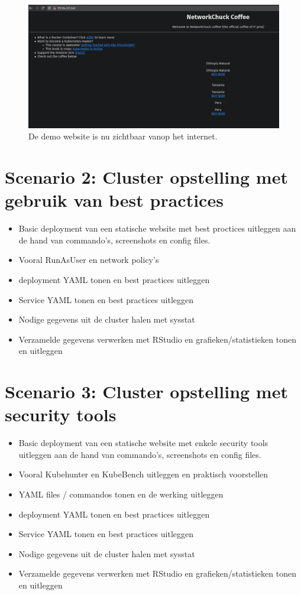 \begin{figure}[h]
	\centering
	\includegraphics[width=\linewidth]{img/demoSite1.png}
	\caption{De demo website is nu zichtbaar vanop het internet.}
	\label{fig:demoSite1}
\end{figure}


\clearpage
\section{Scenario 2: Cluster opstelling met gebruik van best practices}
\begin{itemize}
	\item Basic deployment van een statische website met best proctices uitleggen aan de hand van commando's, screenshots en config files. 
	\item Vooral RunAsUser en network policy's
	\item deployment YAML tonen en best practices uitleggen
	\item Service YAML tonen en best practices uitleggen
	\item Nodige gegevens uit de cluster halen met sysstat
	\item Verzamelde gegevens verwerken met RStudio en grafieken/statistieken tonen en uitleggen
\end{itemize}


\clearpage
\section{Scenario 3: Cluster opstelling met security tools}
\begin{itemize}
	\item Basic deployment van een statische website met enkele security tools uitleggen aan de hand van commando's, screenshots en config files. 
	\item Vooral Kubehunter en KubeBench uitleggen en praktisch voorstellen
	\item YAML files / commandos tonen en de werking uitleggen
	\item deployment YAML tonen en best practices uitleggen
	\item Service YAML tonen en best practices uitleggen
	\item Nodige gegevens uit de cluster halen met sysstat
	\item Verzamelde gegevens verwerken met RStudio en grafieken/statistieken tonen en uitleggen
\end{itemize}
